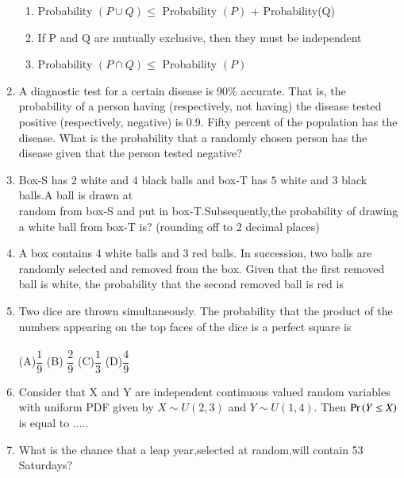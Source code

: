 \documentclass[journal,12pt,twocolumn]{IEEEtran}
\begin{document}
\begin{enumerate}
\begin{enumerate}[label = (\alph*)]
    \item Probability $(P\cup Q) \leq   $ Probability $(P)$ + Probability(Q) 
    \item If P and Q are mutually exclusive, then they must be independent
    \item Probability $(P\cap Q) \leq$ Probability $(P)$
\end{enumerate}
%
\solution

%
\item A diagnostic test for a certain disease is 90\% accurate. That is, the probability of a person having (respectively, not having) the disease tested positive (respectively, negative) is 0.9. Fifty percent of the population has the disease. What is the probability that a randomly chosen person has the disease given that the person tested negative?
\\
\solution

%
\item Box-S has $2$ white and $4$ black balls and box-T has $5$ white and $3$ black balls.A ball is drawn at \\ random from box-S and put in box-T.Subsequently,the probability of drawing a white ball from box-T is? (rounding off to $ 2 $ decimal places)
%
\\
\solution

%
\item A box contains 4 white balls and 3 red balls. In succession, two balls are randomly selected and removed from the box. Given that the first removed ball is white, the probability that the second removed ball is red is 
%
\\
\solution

\item Two dice are thrown simultaneously. The probability that the product of the numbers appearing on the top faces of the dice is a perfect square is  \\ \\
(A)$\dfrac{1}{9}$         \hfill  (B) $\dfrac{2}{9}$  \hfill
(C)$\dfrac{1}{3}$      \hfill       (D)$\dfrac{4}{9}$  
\\
\solution

%
\item
Consider that X and Y are independent continuous valued random variables with uniform PDF given by $X\sim U(2,3)$ and $Y\sim U(1,4)$. Then $\Pr\left(Y\le X\right)$ is equal to .....
\\
\solution

%
\item What is the chance that a leap year,selected at random,will contain 53 Saturdays? \\

\end{enumerate}
\end{document}
